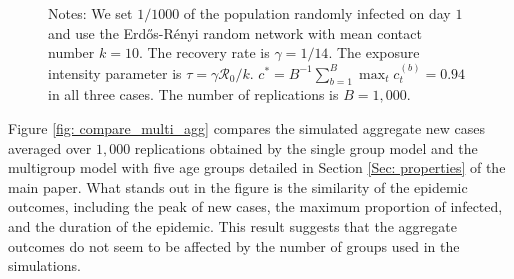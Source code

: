 \documentclass[12pt]{article}
\begin{document}
\begin{figure}[t]
\begin{footnotesize}
\begin{center}
\begin{tabular}
{\includegraphics[
height=1.7071in,
width=2.1283in
]%
{figs/theory_ER_N50000_dcT.png}%
}
&  &
{\includegraphics[
height=1.7071in,
width=2.1283in
]%
{figs/theory_ER_N100000_dcT.png}%
}
\end{tabular}



\end{center}

Notes: We set $1/1000$ of the population randomly infected on day $1$ and use
the Erd\H{o}s-R\'{e}nyi random network with mean contact number $k=10$. The
recovery rate is $\gamma=1/14$. The exposure intensity parameter is
$\tau=\gamma\mathcal{R}_{0}/k$. $c^{\ast}=B^{-1}\sum_{b=1}^{B}\max_{t}%
c_{t}^{(b)}=0.94$ in all three cases. The number of replications is $B=1,000$.%

\end{footnotesize}%
%

\end{figure}%


Figure \ref{fig: compare_multi_agg} compares the simulated aggregate new cases
averaged over $1,000$ replications obtained by the single group model and the
multigroup model with five age groups detailed in Section
\ref{Sec: properties} of the main paper. What stands out in the figure is the
similarity of the epidemic outcomes, including the peak of new cases, the
maximum proportion of infected, and the duration of the epidemic. This result
suggests that the aggregate outcomes do not seem to be affected by the number
of groups used in the simulations.%
\end{document}
